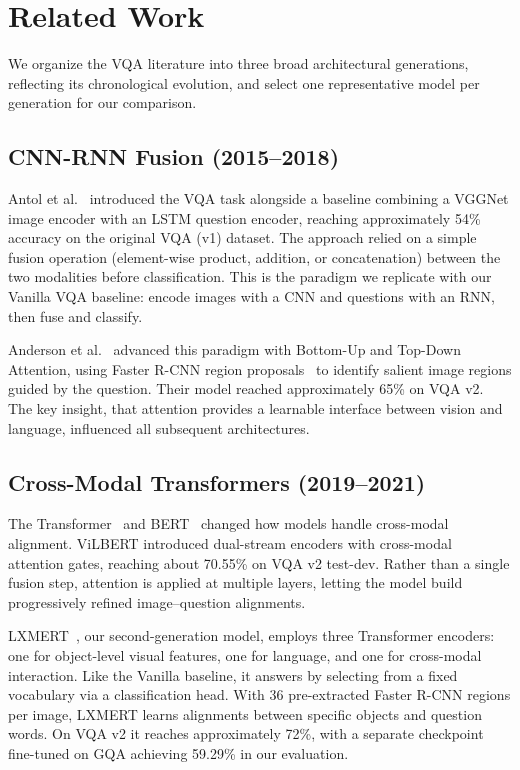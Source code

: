 \section{Related Work}

We organize the VQA literature into three broad architectural generations, reflecting its chronological evolution, and select one representative model per generation for our comparison.

\subsection{CNN-RNN Fusion (2015--2018)}

Antol et al.~\cite{antol2015vqa} introduced the VQA task alongside a baseline combining a VGGNet image encoder with an LSTM question encoder, reaching approximately 54\% accuracy on the original VQA (v1) dataset. The approach relied on a simple fusion operation (element-wise product, addition, or concatenation) between the two modalities before classification. This is the paradigm we replicate with our Vanilla VQA baseline: encode images with a CNN and questions with an RNN, then fuse and classify.

Anderson et al.~\cite{anderson2018bottomup} advanced this paradigm with Bottom-Up and Top-Down Attention, using Faster R-CNN region proposals~\cite{ren2015fasterrcnn} to identify salient image regions guided by the question. Their model reached approximately 65\% on VQA v2. The key insight, that attention provides a learnable interface between vision and language, influenced all subsequent architectures.

\subsection{Cross-Modal Transformers (2019--2021)}

The Transformer~\cite{vaswani2017transformer} and BERT~\cite{DevlinCLT19} changed how models handle cross-modal alignment. ViLBERT \cite{lu2019vilbert} introduced dual-stream encoders with cross-modal attention gates, reaching about 70.55\% on VQA v2 test-dev. Rather than a single fusion step, attention is applied at multiple layers, letting the model build progressively refined image--question alignments.

LXMERT~\cite{tan2019lxmert}, our second-generation model, employs three Transformer encoders: one for object-level visual features, one for language, and one for cross-modal interaction. Like the Vanilla baseline, it answers by selecting from a fixed vocabulary via a classification head. With 36 pre-extracted Faster R-CNN regions per image, LXMERT learns alignments between specific objects and question words. On VQA v2 it reaches approximately 72\%, with a separate checkpoint fine-tuned on GQA achieving 59.29\% in our evaluation.


